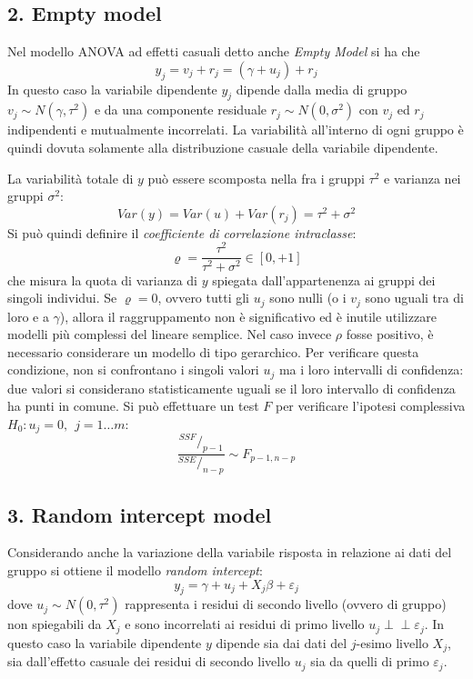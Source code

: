 \documentclass[a4page, 11pt]{article} %
\def\indep{\perp \!\!\! \perp }   %
\begin{document}
\subsection*{2. Empty model}
Nel modello ANOVA ad effetti casuali detto anche \textit{Empty Model} si ha che
\begin{equation*}
y_j = v_j + r_j = (\gamma + u_j) + r_j
\end{equation*}
In questo caso la variabile dipendente $y_j$ dipende dalla media di gruppo $v_j \sim N(\gamma, \tau^2)$ e da una componente residuale $r_j \sim N(0, \sigma^2)$ con $v_j$ ed $r_j$ indipendenti e mutualmente incorrelati.
La variabilità all’interno di ogni gruppo è quindi dovuta solamente alla distribuzione casuale della variabile dipendente.

La variabilità totale di $y$ può essere scomposta nella fra i gruppi $\tau^2$ e varianza nei gruppi $\sigma^2$:
\begin{equation*}
Var(y) = Var(u)+Var(r_j) = \tau^2 + \sigma^2
\end{equation*}
Si può quindi definire il \textit{coefficiente di correlazione intraclasse}:
\begin{equation*}
\varrho = \frac{\tau^2}{\tau^2 + \sigma^2} \in [0, +1]
\end{equation*}
che misura la quota di varianza di $y$ spiegata dall’appartenenza ai gruppi dei singoli individui.
Se $\varrho = 0$, ovvero tutti gli $u_j$ sono nulli (o i $v_j$ sono uguali tra di loro e a $\gamma$), allora il raggruppamento non è significativo ed è inutile utilizzare modelli più complessi del lineare semplice.
Nel caso invece $\rho$ fosse positivo, è necessario considerare un modello di tipo gerarchico.
Per verificare questa condizione, non si confrontano i singoli valori $u_j$ ma i loro intervalli di confidenza: due valori si considerano statisticamente uguali se il loro intervallo di confidenza ha punti in comune.
Si può effettuare un test $F$ per verificare l'ipotesi complessiva $H_0 : u_j = 0, \hspace{5pt} j = 1 \dots m$:
\begin{equation*}
  \frac{^{SSF}/_{p - 1}}{^{SSE}/_{n - p}} \sim F_{p - 1, n - p}
\end{equation*}

\subsection*{3. Random intercept model}
Considerando anche la variazione della variabile risposta in relazione ai dati del gruppo si ottiene il modello \textit{random intercept}:
\begin{equation*}
y_j = \gamma + u_j + X_j \beta + \varepsilon_j
\end{equation*}
dove $u_j \sim N(0, \tau^2)$ rappresenta i residui di secondo livello (ovvero di gruppo) non spiegabili da $X_j$ e sono incorrelati ai residui di primo livello $u_j \indep \varepsilon_j$.
In questo caso la variabile dipendente $y$ dipende sia dai dati del $j$-esimo livello $X_j$, sia dall'effetto casuale dei residui di secondo livello $u_j$ sia da quelli di primo $\varepsilon_j$.
\end{document}
